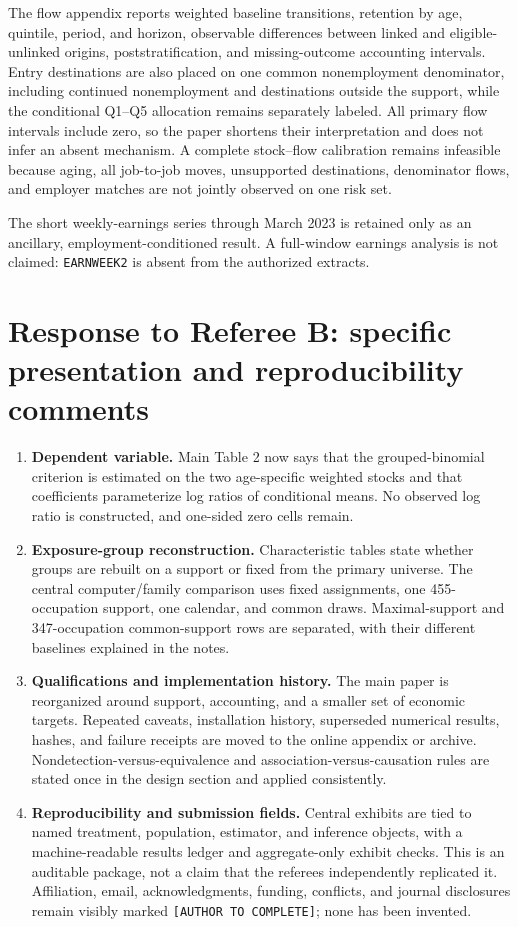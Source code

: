 \documentclass[11pt,letterpaper]{article}
\begin{document}
The flow appendix reports weighted baseline transitions, retention by age, quintile, period, and horizon, observable differences between linked and eligible-unlinked origins, poststratification, and missing-outcome accounting intervals.  Entry destinations are also placed on one common nonemployment denominator, including continued nonemployment and destinations outside the support, while the conditional Q1--Q5 allocation remains separately labeled.  All primary flow intervals include zero, so the paper shortens their interpretation and does not infer an absent mechanism.  A complete stock--flow calibration remains infeasible because aging, all job-to-job moves, unsupported destinations, denominator flows, and employer matches are not jointly observed on one risk set.

The short weekly-earnings series through March 2023 is retained only as an ancillary, employment-conditioned result.  A full-window earnings analysis is not claimed: \texttt{EARNWEEK2} is absent from the authorized extracts.

\section*{Response to Referee B: specific presentation and reproducibility comments}

\begin{enumerate}[leftmargin=1.8em]
\item \textbf{Dependent variable.}  Main Table 2 now says that the grouped-binomial criterion is estimated on the two age-specific weighted stocks and that coefficients parameterize log ratios of conditional means.  No observed log ratio is constructed, and one-sided zero cells remain.
\item \textbf{Exposure-group reconstruction.}  Characteristic tables state whether groups are rebuilt on a support or fixed from the primary universe.  The central computer/family comparison uses fixed assignments, one 455-occupation support, one calendar, and common draws.  Maximal-support and 347-occupation common-support rows are separated, with their different baselines explained in the notes.
\item \textbf{Qualifications and implementation history.}  The main paper is reorganized around support, accounting, and a smaller set of economic targets.  Repeated caveats, installation history, superseded numerical results, hashes, and failure receipts are moved to the online appendix or archive.  Nondetection-versus-equivalence and association-versus-causation rules are stated once in the design section and applied consistently.
\item \textbf{Reproducibility and submission fields.}  Central exhibits are tied to named treatment, population, estimator, and inference objects, with a machine-readable results ledger and aggregate-only exhibit checks.  This is an auditable package, not a claim that the referees independently replicated it.  Affiliation, email, acknowledgments, funding, conflicts, and journal disclosures remain visibly marked \texttt{[AUTHOR TO COMPLETE]}; none has been invented.
\end{enumerate}
\end{document}
